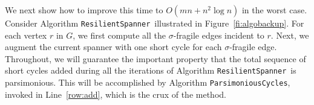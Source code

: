 \documentclass{article}
\newcommand{\commento}[1] {}
\newcommand{\round}[1]       {\left( #1 \right)}
\newcommand{\ResilientSpanner}{\texttt{ResilientSpanner}}
\newcommand{\ParsimoniousCycles}{\texttt{ParsimoniousCycles}}
\newcounter{progcount}
\newcounter{linecount}[progcount]
\newcommand{\N}{\refstepcounter{linecount}\thelinecount. \>}
\newcommand{\NL}[1]{\refstepcounter{linecount}\thelinecount. \label{#1}\>}
\newenvironment{prog}[1]{
    \refstepcounter{progcount}\label{#1}
    \par\vspace{0.5ex}\noindent\hspace{1ex}
    \begin{minipage}{\linewidth}
    \small
    \begin{tabbing}
    =spa\=spa\=spa\=spa\=spa\=spa\=spa\=spa\=spa\=spa\=spa\=spa\=\kill
}{
    \end{tabbing}
    \end{minipage}\\[0.5ex]
}
\newcommand{\key}[1]{\textbf{#1~}}\ignorespaces
\begin{document}
We next show how to improve this time to $O\round{m n + n^2 \log n}$ in the worst case.
Consider Algorithm \ResilientSpanner\ illustrated in Figure~\ref{fi:algobackup}. For each vertex $r$ in $G$, we first compute all the $\sigma$-fragile edges incident to $r$. Next, we augment the current spanner with 
one short cycle for each $\sigma$-fragile edge. Throughout, we will guarantee the important property that the total sequence of short cycles added during all the iterations of Algorithm \ResilientSpanner\ is parsimonious. 
This will be accomplished by  Algorithm \ParsimoniousCycles, invoked in Line~\ref{row:add}, which is the crux of the method. 
\commento{
\begin{figure}[ht]
\noindent\hrulefill \begin{prog}{pr:resilientspanner}
\key{Algorithm} ResilientSpanner($G$, $S$, $\sigma$, $E_S(\sigma)$)\\
\key{input:}\\
\>  graph $G$\\
\>  a $t$-spanner $S$ of $G$\\
\>  a fragility threshold $\sigma$, with $\sigma \geq t$\\
\>  the set of $\sigma$-fragile edges $E_S(\sigma)$\\
\key{output:}\\
\>  a $\sigma$-resilient $t$-spanner $R$ of $G$, with $R \supseteq S$ \\[1mm]

\vspace{0.3cm}\\
\N  \key{let}$R = S$\\
\N  \key{for each}vertex $r$ in $G$\\
\N  \>  \key{let}$E_r$ be the set of $\sigma$-fragile edge in $R$ incident to $r$\\
\NL{row:cycle}  \>  \key{for each} edge $e=(r,x) \in E_r$,\\
\NL{row:following}  \>  \>  add to $R$ a short cycle $c_x \in \Gamma_{e}(G)$ such that\\
\>  \>  \>  the sequence of added cycles is parsimonious\\
\end{prog}

\caption{Algorithm ResilientSpanner.}
\protect\label{fi:algobackup}
\noindent\hrulefill \end{figure}
}
\end{document}
